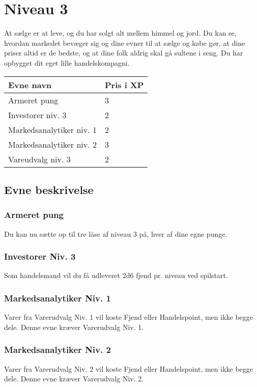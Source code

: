 \chapter*{Niveau 3}

At sælge er at leve, og du har solgt alt mellem himmel og jord. Du kan se, hvordan markedet bevæger sig og dine evner til at sælge og købe gør, at dine priser altid er de bedste, og at dine folk aldrig skal gå sultene i seng. Du har opbygget dit eget lille handelskompagni. 

\begin{table}[H]
    \centering
    \begin{tabular}{|p{}|p{}|}
    \rowcolor{cerulean!80}\hline
        Evne navn & Pris i XP \\\hline
        Armeret pung & 3\\\hline
        Investorer niv. 3& 2\\\hline
        Markedsanalytiker niv. 1& 2\\\hline
        Markedsanalytiker niv. 2& 3\\\hline
        Vareudvalg niv. 3& 2\\\hline
    \end{tabular}
\end{table}
\section*{Evne beskrivelse}

\subsection*{Armeret pung}
Du kan nu sætte op til tre låse af niveau 3 på, hver af dine egne punge.\\

\subsection*{Investorer Niv. 3}
Som handelsmand vil du få udleveret 2d6 fjend pr. niveau ved spilstart.
\\

\subsection*{Markedsanalytiker Niv. 1}
Varer fra Varerudvalg Niv. 1 vil koste Fjend eller Handelspoint, men ikke begge dele. Denne evne kræver Varerudvalg Niv. 1.\\

\subsection*{Markedsanalytiker Niv. 2}
Varer fra Varerudvalg Niv. 2 vil koste Fjend eller Handelspoint, men ikke begge dele. Denne evne kræver Varerudvalg Niv. 2.\\

